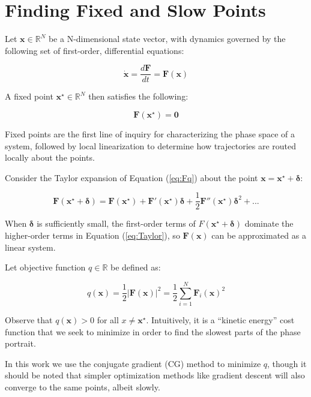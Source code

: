 \documentclass{article} %
\newcommand{\bf}[1]{\mathbf{#1}}
\newcommand{\x}{\bf{x}}
\newcommand{\xstar}{\bf{x^\star}}
\newcommand{\F}{\bf{F}}
\begin{document}
\section{Finding Fixed and Slow Points}

Let $\x \in \mathbb{R}^N$ be a N-dimensional state vector, with dynamics governed by the following set of first-order, differential equations:

\begin{equation}
\dot{\x} = \frac{d\F}{dt} = \F(\x)
\end{equation}

A fixed point $\xstar \in \mathbb{R}^N$ then satisfies the following:

\begin{equation} \label{eq:Fq}
  \F(\xstar) = \bf{0}
\end{equation}

Fixed points are the first line of inquiry for characterizing the phase space of a system, followed by local linearization to determine how trajectories are routed locally about the points.

Consider the Taylor expansion of Equation (\ref{eq:Fq}) about the point $\x = \xstar+\bf{\delta}$:

\begin{equation} \label{eq:Taylor}
  \F(\xstar+\bf{\delta}) = \F(\xstar) + \F'(\xstar)\bf{\delta} + \frac{1}{2}\F''(\xstar)\bf{\delta}^2 +...
\end{equation}

When $\bf{\delta}$ is sufficiently small, the first-order terms of $F(\xstar+\bf{\delta})$ dominate the higher-order terms in Equation (\ref{eq:Taylor}), so $\F(\x)$ can be approximated as a linear system.

Let objective function $q \in \mathbb{R}$ be defined as:

\begin{equation} \label{eq:q}
  q(\x)=\frac{1}{2}{|\F(\x)|^2}=\frac{1}{2}\sum_{i=1}^{N}{\F_i(\x)^2}
\end{equation}

Observe that $q(\x) > 0$ for all $x \neq \xstar$. Intuitively, it is a ``kinetic energy'' cost function that we seek to minimize in order to find the slowest parts of the phase portrait.

In this work we use the conjugate gradient (CG) method to minimize $q$, though it should be noted that simpler optimization methods like gradient descent will also converge to the same points, albeit slowly.
\end{document}
